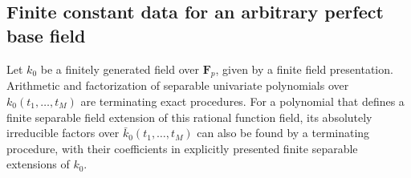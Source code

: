 \subsection{Finite constant data for an arbitrary perfect base field}
\label{subsec:perfect-field-monodromy-data}

\begin{lemma}\label{lem:effective-separable-factorization}
Let $k_0$ be a finitely generated field over $\mathbf F_p$,
given by a finite field presentation.  Arithmetic and
factorization of separable univariate polynomials over
$k_0(t_1,\ldots,t_M)$ are terminating exact procedures.
For a polynomial that defines a finite separable field
extension of this rational function field, its absolutely
irreducible factors over $\bar k_0(t_1,\ldots,t_M)$ can
also be found by a terminating procedure, with their
coefficients in explicitly presented finite separable
extensions of $k_0$.
\end{lemma}

